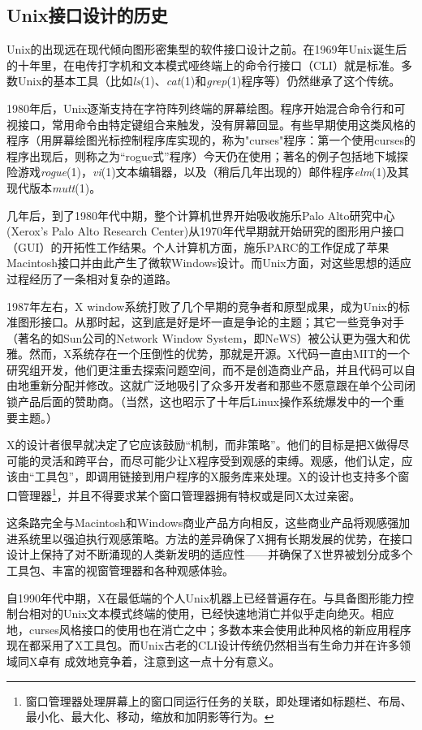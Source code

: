 \documentclass[12pt,oneside]{book}
\begin{document}
\begin{common-format}
\section{Unix接口设计的历史}
Unix的出现远在现代倾向图形密集型的软件接口设计之前。在1969年Unix诞生后的十年里，在电传打字机和文本模式哑终端上的命令行接口（CLI）就是标准。多数Unix的基本工具（比如\textit{ls}(1)、\textit{cat}(1)和\textit{grep}(1)程序等）仍然继承了这个传统。

1980年后，Unix逐渐支持在字符阵列终端的屏幕绘图。程序开始混合命令行和可视接口，常用命令由特定键组合来触发，没有屏幕回显。有些早期使用这类风格的程序（用屏幕绘图光标控制程序库实现的，称为"curses"程序：第一个使用curses的程序出现后，则称之为“rogue式”程序）今天仍在使用；著名的例子包括地下城探险游戏\textit{rogue}(1)，\textit{vi}(1)文本编辑器，以及（稍后几年出现的）邮件程序\textit{elm}(1)及其现代版本\textit{mutt}(1)。

几年后，到了1980年代中期，整个计算机世界开始吸收施乐Palo Alto研究中心(Xerox's Palo Alto Research Center)从1970年代早期就开始研究的图形用户接口（GUI）的开拓性工作结果。个人计算机方面，施乐PARC的工作促成了苹果Macintosh接口并由此产生了微软Windows设计。而Unix方面，对这些思想的适应过程经历了一条相对复杂的道路。

1987年左右，X window系统打败了几个早期的竞争者和原型成果，成为Unix的标准图形接口。从那时起，这到底是好是坏一直是争论的主题；其它一些竞争对手（著名的如Sun公司的Network Window System，即NeWS）被公认更为强大和优雅。然而，X系统存在一个压倒性的优势，那就是开源。X代码一直由MIT的一个研究组开发，他们更注重去探索问题空间，而不是创造商业产品，并且代码可以自由地重新分配并修改。这就广泛地吸引了众多开发者和那些不愿意跟在单个公司闭锁产品后面的赞助商。（当然，这也昭示了十年后Linux操作系统爆发中的一个重要主题。）

X的设计者很早就决定了它应该鼓励“机制，而非策略”。他们的目标是把X做得尽可能的灵活和跨平台，而尽可能少让X程序受到观感的束缚。观感，他们认定，应该由“工具包”，即调用链接到用户程序的X服务库来处理。X的设计也支持多个窗口管理器\footnote{窗口管理器处理屏幕上的窗口同运行任务的关联，即处理诸如标题栏、布局、最小化、最大化、移动，缩放和加阴影等行为。}，并且不得要求某个窗口管理器拥有特权或是同X太过亲密。

这条路完全与Macintosh和Windows商业产品方向相反，这些商业产品将观感强加进系统里以强迫执行观感策略。方法的差异确保了X拥有长期发展的优势，在接口设计上保持了对不断涌现的人类新发明的适应性——并确保了X世界被划分成多个工具包、丰富的视窗管理器和各种观感体验。

自1990年代中期，X在最低端的个人Unix机器上已经普遍存在。与具备图形能力控制台相对的Unix文本模式终端的使用，已经快速地消亡并似乎走向绝灭。相应地，curses风格接口的使用也在消亡之中；多数本来会使用此种风格的新应用程序现在都采用了X工具包。而Unix古老的CLI设计传统仍然相当有生命力并在许多领域同X卓有
成效地竞争着，注意到这一点十分有意义。


\end{common-format}
\end{document}
